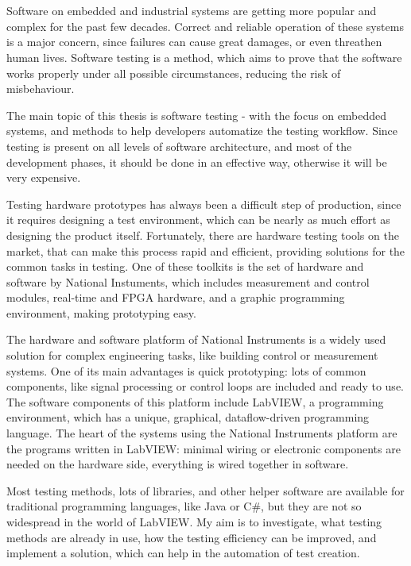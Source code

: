 \chapter{\bevezetes}

Software on embedded and industrial systems are getting more popular and complex for the past few decades. Correct and reliable operation of these systems is a major concern, since failures can cause great damages, or even threathen human lives. Software testing is a method, which aims to prove that the software works properly under all possible circumstances, reducing the risk of misbehaviour.

The main topic of this thesis is software testing - with the focus on embedded systems, and methods to help developers automatize the testing workflow. Since testing is present on all levels of software architecture, and most of the development phases, it should be done in an effective way, otherwise it will be very expensive. 

Testing hardware prototypes has always been a difficult step of production, since it requires designing a test environment, which can be nearly as much effort as designing the product itself. Fortunately, there are hardware testing tools on the market, that can make this process rapid and efficient, providing solutions for the common tasks in testing. One of these toolkits is the set of hardware and software by National Instuments, which includes measurement and control modules, real-time and FPGA hardware, and a graphic programming environment, making prototyping easy.

The hardware and software platform of National Instruments is a widely used solution for complex engineering tasks, like building control or measurement systems. One of its main advantages is quick prototyping: lots of common components, like signal processing or control loops are included and ready to use. The software components of this platform include LabVIEW, a programming environment, which has a unique, graphical, dataflow-driven programming language. The heart of the systems using the National Instruments platform are the programs written in LabVIEW: minimal wiring or electronic components are needed on the hardware side, everything is wired together in software.

Most testing methods, lots of libraries, and other helper software are available for traditional programming languages, like Java or C\#, but they are not so widespread in the world of LabVIEW. My aim is to investigate, what testing methods are already in use, how the testing efficiency can be improved, and implement a solution, which can help in the automation of test creation.
